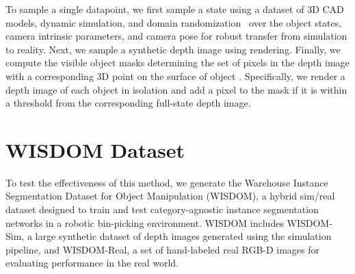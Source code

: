 \documentclass[letterpaper, 10 pt, conference]{ieeeconf}  \pdfoutput=1
\numberwithin{equation}{section}
\begin{document}
To sample a single datapoint, we first sample a state  using a dataset of 3D CAD models, dynamic simulation, and domain randomization~\cite{tobin2017domain} over the object states, camera intrinsic parameters, and camera pose for robust transfer from simulation to reality.
Next, we sample a synthetic depth image  using rendering.
Finally, we compute the visible object masks  determining the set of pixels in the depth image with a corresponding 3D point on the surface of object .
Specifically, we render a depth image of each object in isolation and add a pixel to the mask if it is within a threshold from the corresponding full-state depth image.



%
 \section{WISDOM Dataset}

To test the effectiveness of this method, we generate the Warehouse Instance Segmentation Dataset for Object Manipulation (WISDOM), a hybrid sim/real dataset designed to train and test category-agnostic instance segmentation networks in a robotic bin-picking environment.
WISDOM includes WISDOM-Sim, a large synthetic dataset of depth images generated using the simulation pipeline, and WISDOM-Real, a set of hand-labeled real RGB-D images for evaluating performance in the real world.
\end{document}
